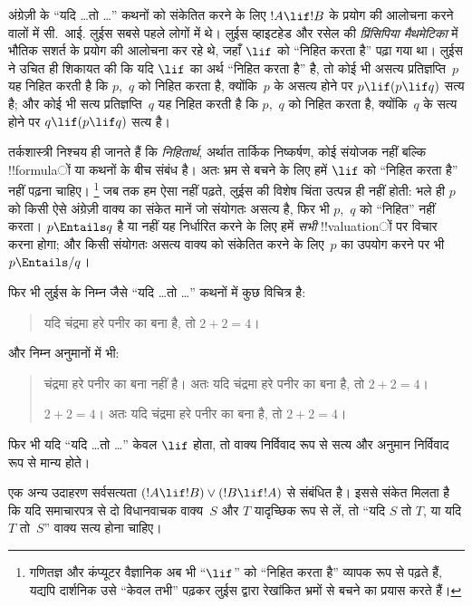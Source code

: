 \documentclass[../../../include/open-logic-section]{subfiles}
\begin{document}


अंग्रेज़ी के ``यदि \dots तो \dots'' कथनों को संकेतित करने के लिए
$!A \lif !B$ के प्रयोग की आलोचना करने वालों में सी.~आई. लुईस सबसे पहले
लोगों में थे। लुईस व्हाइटहेड और रसेल की \emph{प्रिंसिपिया मैथमेटिका} में
भौतिक सशर्त के प्रयोग की आलोचना कर रहे थे, जहाँ $\lif$ को ``निहित करता है''
पढ़ा गया था। लुईस ने उचित ही शिकायत की कि यदि $\lif$ का अर्थ ``निहित करता
है'' है, तो कोई भी असत्य प्रतिज्ञप्ति~$p$ यह निहित करती है कि $p$,~$q$ को
निहित करता है, क्योंकि~$p$ के असत्य होने पर $p \lif (p \lif q)$ सत्य है;
और कोई भी सत्य प्रतिज्ञप्ति~$q$ यह निहित करती है कि $p$,~$q$ को निहित करता
है, क्योंकि~$q$ के सत्य होने पर $q \lif (p \lif q)$ सत्य है।

तर्कशास्त्री निश्चय ही जानते हैं कि \emph{निहितार्थ}, अर्थात तार्किक
निष्कर्षण, कोई संयोजक नहीं बल्कि !!{formula}ों या कथनों के बीच संबंध है। अतः
भ्रम से बचने के लिए हमें $\lif$ को ``निहित करता है'' नहीं पढ़ना चाहिए।
\footnote{गणितज्ञ और कंप्यूटर वैज्ञानिक अब भी ``$\lif$'' को ``निहित करता
  है'' व्यापक रूप से पढ़ते हैं, यद्यपि दार्शनिक उसे ``केवल तभी'' पढ़कर लुईस
  द्वारा रेखांकित भ्रमों से बचने का प्रयास करते हैं।} जब तक हम ऐसा नहीं
पढ़ते, लुईस की विशेष चिंता उत्पन्न ही नहीं होती: भले ही $p$ को किसी ऐसे
अंग्रेज़ी वाक्य का संकेत मानें जो संयोगतः असत्य है, फिर भी $p$,~$q$ को
``निहित'' नहीं करता। $p \Entails q$ है या नहीं यह निर्धारित करने के लिए
हमें \emph{सभी} !!{valuation}ों पर विचार करना होगा; और किसी संयोगतः असत्य
वाक्य को संकेतित करने के लिए~$p$ का उपयोग करने पर भी $p \Entails/ q$।

फिर भी लुईस के निम्न जैसे ``यदि \dots तो \dots'' कथनों में कुछ विचित्र है:
\begin{quote}
यदि चंद्रमा हरे पनीर का बना है, तो $2+2=4$।
\end{quote}
और निम्न अनुमानों में भी:
\begin{quote}
  चंद्रमा हरे पनीर का बना नहीं है। अतः यदि चंद्रमा हरे पनीर का बना है, तो
  $2+2=4$।

  $2+2 = 4$। अतः यदि चंद्रमा हरे पनीर का बना है, तो $2+2=4$।
\end{quote}
फिर भी यदि ``यदि \dots तो \dots'' केवल $\lif$ होता, तो वाक्य निर्विवाद रूप
से सत्य और अनुमान निर्विवाद रूप से मान्य होते।

एक अन्य उदाहरण सर्वसत्यता $(!A \lif !B) \lor (!B \lif !A)$ से संबंधित है।
इससे संकेत मिलता है कि यदि समाचारपत्र से दो विधानवाचक वाक्य~$S$ और $T$
यादृच्छिक रूप से लें, तो ``यदि $S$ तो $T$, या यदि $T$ तो~$S$'' वाक्य सत्य
होना चाहिए।
\end{document}
